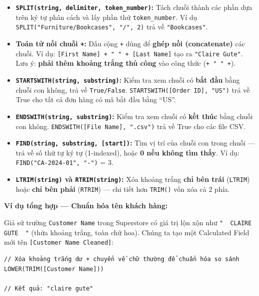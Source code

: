\documentclass[12pt]{article}
\begin{document}
\begin{itemize}
    \item \textbf{\texttt{SPLIT(string, delimiter, token\_number)}:} Tách chuỗi thành các phần dựa trên ký tự phân cách và lấy phần thứ \texttt{token\_number}. Ví dụ \texttt{SPLIT("Furniture/Bookcases", "/", 2)} trả về \texttt{"Bookcases"}.

    \item \textbf{Toán tử nối chuỗi \texttt{+}:} Dấu cộng \texttt{+} dùng để \textbf{ghép nối (concatenate)} các chuỗi. Ví dụ: \texttt{[First Name] + " " + [Last Name]} tạo ra \texttt{"Claire Gute"}. Lưu ý: \textbf{phải thêm khoảng trắng thủ công} vào công thức (\texttt{+ " " +}).

    \item \textbf{\texttt{STARTSWITH(string, substring)}:} Kiểm tra xem chuỗi có \textbf{bắt đầu} bằng chuỗi con không, trả về \texttt{True/False}. \texttt{STARTSWITH([Order ID], "US")} trả về True cho tất cả đơn hàng có mã bắt đầu bằng ``US''.

    \item \textbf{\texttt{ENDSWITH(string, substring)}:} Kiểm tra xem chuỗi có \textbf{kết thúc} bằng chuỗi con không. \texttt{ENDSWITH([File Name], ".csv")} trả về True cho các file CSV.

    \item \textbf{\texttt{FIND(string, substring, [start])}:} Tìm vị trí của chuỗi con trong chuỗi --- trả về số thứ tự ký tự (1-indexed), hoặc \textbf{0 nếu không tìm thấy}. Ví dụ: \texttt{FIND("CA-2024-01", "-")} = 3.

    \item \textbf{\texttt{LTRIM(string)} và \texttt{RTRIM(string)}:} Xóa khoảng trắng \textbf{chỉ bên trái} (\texttt{LTRIM}) hoặc \textbf{chỉ bên phải} (\texttt{RTRIM}) --- chi tiết hơn \texttt{TRIM()} vốn xóa cả 2 phía.
\end{itemize}

\noindent \textbf{Ví dụ tổng hợp --- Chuẩn hóa tên khách hàng:}

\noindent Giả sử trường \texttt{Customer Name} trong Superstore có giá trị lộn xộn như \texttt{"~~CLAIRE GUTE~~"} (thừa khoảng trắng, toàn chữ hoa). Chúng ta tạo một Calculated Field mới tên \texttt{[Customer Name Cleaned]}:

\begin{aivncodebox}[]
\begin{lstlisting}
// Xóa khoảng trắng dư + chuyển về chữ thường để chuẩn hóa so sánh
LOWER(TRIM([Customer Name]))

// Kết quả: "claire gute"
\end{lstlisting}
\end{aivncodebox}
\end{document}
